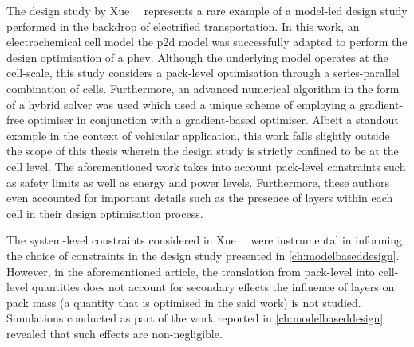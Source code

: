 

The  design study  by Xue~\etal~\cite{Xue2014}  represents a  rare example  of a
model-led design study performed in  the backdrop of electrified transportation.
In  this work,  an electrochemical  cell model  \viz{} the  \gls{p2d} model  was
successfully  adapted  to  perform  the design  optimisation  of  a  \gls{phev}.
Although the underlying  model operates at the cell-scale,  this study considers
a  pack-level  optimisation  through  a series-parallel  combination  of  cells.
Furthermore, an advanced numerical algorithm in  the form of a hybrid solver was
used  which used  a  unique scheme  of employing  a  gradient-free optimiser  in
conjunction with  a gradient-based optimiser.  Albeit a standout example  in the
context of vehicular application, this work  falls slightly outside the scope of
this thesis  wherein the  design study is  strictly confined to  be at  the cell
level. The aforementioned work takes into account pack-level constraints such as
safety limits  as well as  energy and  power levels. Furthermore,  these authors
even accounted for important details such  as the presence of layers within each
cell in their design optimisation process.

The  system-level   constraints  considered  in   Xue~\etal~\cite{Xue2014}  were
instrumental  in  informing  the  choice  of constraints  in  the  design  study
presented in \cref{ch:modelbaseddesign}. However, in the aforementioned article,
the translation from pack-level into  cell-level quantities does not account for
secondary effects \ie{} the influence of layers on pack mass (a quantity that is
optimised in the said work) is not studied. Simulations conducted as part of the
work  reported  in \cref{ch:modelbaseddesign}  revealed  that  such effects  are
non-negligible.


